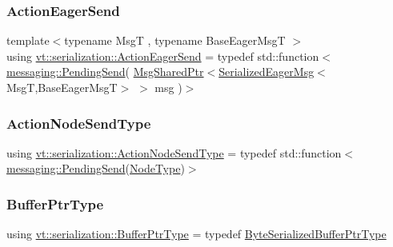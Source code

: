 \subsubsection{\texorpdfstring{Action\+Eager\+Send}{ActionEagerSend}}
{\footnotesize\ttfamily template$<$typename MsgT , typename Base\+Eager\+MsgT $>$ \\
using \hyperlink{namespacevt_1_1serialization_a009aa1de8d42a3c97643b947fcc6f0b6}{vt\+::serialization\+::\+Action\+Eager\+Send} = typedef std\+::function$<$\hyperlink{structvt_1_1messaging_1_1_pending_send}{messaging\+::\+Pending\+Send}( \hyperlink{namespacevt_ab2b3d506ec8e8d1540aede826d84a239}{Msg\+Shared\+Ptr}$<$\hyperlink{namespacevt_1_1serialization_ac8b37425f8316a800cdb0b0f0f8a6438}{Serialized\+Eager\+Msg}$<$MsgT,Base\+Eager\+MsgT$>$ $>$ msg )$>$}

\mbox{\label{namespacevt_1_1serialization_ad4f189ca4817d31b73436c92bca55deb}} 
\subsubsection{\texorpdfstring{Action\+Node\+Send\+Type}{ActionNodeSendType}}
{\footnotesize\ttfamily using \hyperlink{namespacevt_1_1serialization_ad4f189ca4817d31b73436c92bca55deb}{vt\+::serialization\+::\+Action\+Node\+Send\+Type} = typedef std\+::function$<$\hyperlink{structvt_1_1messaging_1_1_pending_send}{messaging\+::\+Pending\+Send}(\hyperlink{namespacevt_a866da9d0efc19c0a1ce79e9e492f47e2}{Node\+Type})$>$}

\mbox{\label{namespacevt_1_1serialization_a88fa9b491e54f71b1a16d8464e5fc0a9}} 
\subsubsection{\texorpdfstring{Buffer\+Ptr\+Type}{BufferPtrType}}
{\footnotesize\ttfamily using \hyperlink{namespacevt_1_1serialization_a88fa9b491e54f71b1a16d8464e5fc0a9}{vt\+::serialization\+::\+Buffer\+Ptr\+Type} = typedef \hyperlink{namespacevt_1_1serialization_a8f2372c7f89aee28287323667fac2cf5}{Byte\+Serialized\+Buffer\+Ptr\+Type}}

